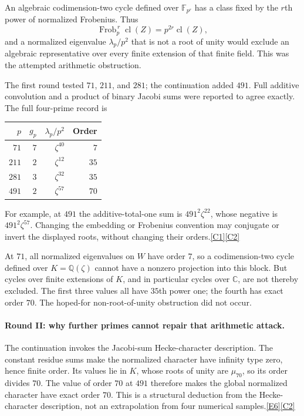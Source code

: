 \documentclass[11pt]{article}
\newcommand{\Q}{\mathbb Q}
\newcommand{\C}{\mathbb C}
\newcommand{\F}{\mathbb F}
\newcommand{\cl}{\operatorname{cl}}
\newcommand{\src}[1]{\hyperlink{src:#1}{[#1]}}
\begin{document}
An algebraic codimension-two cycle defined over $\F_{p^r}$ has a class fixed
by the $r$th power of normalized Frobenius. Thus
\[
 \operatorname{Frob}_p^{\,r}\cl(Z)=p^{2r}\cl(Z),
\]
and a normalized eigenvalue $\lambda_p/p^2$ that is not a root of unity would
exclude an algebraic representative over every finite extension of that
finite field. This was the attempted arithmetic obstruction.

The first round tested $71$, $211$, and $281$; the continuation added $491$.
Full additive convolution and a product of binary Jacobi sums were reported
to agree exactly. The full four-prime record is
\begin{center}
\begin{tabular}{rrrr}
\toprule
$p$ & $g_p$ & $\lambda_p/p^2$ & Order\\
\midrule
$71$ & $7$ & $\zeta^{40}$ & $7$\\
$211$ & $2$ & $\zeta^{12}$ & $35$\\
$281$ & $3$ & $\zeta^{32}$ & $35$\\
$491$ & $2$ & $\zeta^{57}$ & $70$\\
\bottomrule
\end{tabular}
\end{center}
For example, at $491$ the additive-total-one sum is
$491^2\zeta^{22}$, whose negative is $491^2\zeta^{57}$. Changing the embedding
or Frobenius convention may conjugate or invert the displayed roots, without
changing their orders.\src{C1}\src{C2}

At $71$, all normalized eigenvalues on $W$ have order $7$, so a
codimension-two cycle defined over $K=\Q(\zeta)$ cannot have a nonzero
projection into this block. But cycles over finite extensions of $K$, and in
particular cycles over $\C$, are not thereby excluded. The first three
values all have $35$th power one; the fourth has exact order $70$. The
hoped-for non-root-of-unity obstruction did not occur.

\paragraph{Round II: why further primes cannot repair that arithmetic attack.}
The continuation invokes the Jacobi-sum Hecke-character description. The
constant residue sums make the normalized character have infinity type zero,
hence finite order. Its values lie in $K$, whose roots of unity are
$\mu_{70}$, so its order divides $70$. The value of order $70$ at $491$
therefore makes the global normalized character have exact order $70$.
This is a structural deduction from the Hecke-character description, not an
extrapolation from four numerical samples.\src{E6}\src{C2}
\end{document}
